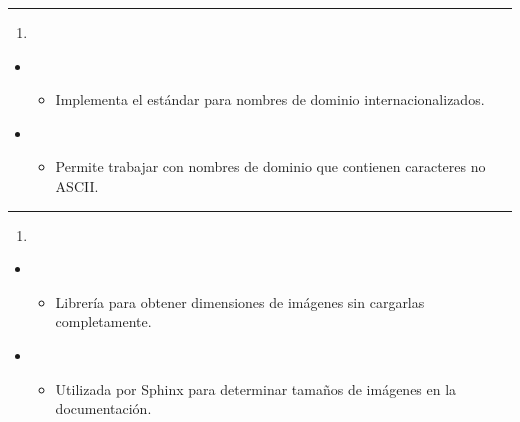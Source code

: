 \documentclass[a4paper,10pt,spanish]{sphinxmanual}
\begin{document}
\bigskip\hrule\bigskip

\begin{enumerate}
%
\setcounter{enumi}{6}
\item {} 
\sphinxAtStartPar
{}

\end{enumerate}
\begin{itemize}
\item {} 
\sphinxAtStartPar
{}
\begin{itemize}
\item {} 
\sphinxAtStartPar
Implementa el estándar  para nombres de dominio internacionalizados.

\end{itemize}

\item {} 
\sphinxAtStartPar
{}
\begin{itemize}
\item {} 
\sphinxAtStartPar
Permite trabajar con nombres de dominio que contienen caracteres no ASCII.

\end{itemize}

\end{itemize}


\bigskip\hrule\bigskip

\begin{enumerate}
%
\setcounter{enumi}{7}
\item {} 
\sphinxAtStartPar
{}

\end{enumerate}
\begin{itemize}
\item {} 
\sphinxAtStartPar
{}
\begin{itemize}
\item {} 
\sphinxAtStartPar
Librería para obtener dimensiones de imágenes sin cargarlas completamente.

\end{itemize}

\item {} 
\sphinxAtStartPar
{}
\begin{itemize}
\item {} 
\sphinxAtStartPar
Utilizada por Sphinx para determinar tamaños de imágenes en la documentación.

\end{itemize}

\end{itemize}
\end{document}
